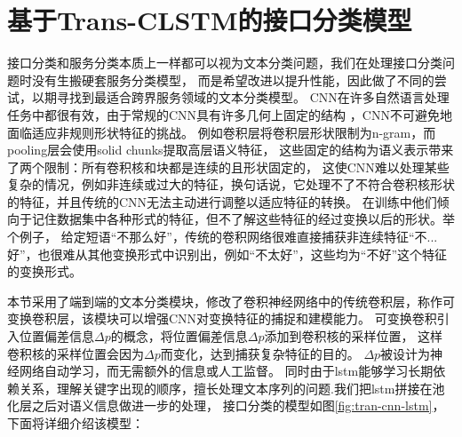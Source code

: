 \section{基于Trans-CLSTM的接口分类模型}
接口分类和服务分类本质上一样都可以视为文本分类问题，我们在处理接口分类问题时没有生搬硬套服务分类模型，
而是希望改进以提升性能，因此做了不同的尝试，以期寻找到最适合跨界服务领域的文本分类模型。
CNN在许多自然语言处理任务中都很有效，由于常规的CNN具有许多几何上固定的结构 ，CNN不可避免地面临适应非规则形状特征的挑战。
例如卷积层将卷积层形状限制为n-gram，而pooling层会使用solid chunks提取高层语义特征，
这些固定的结构为语义表示带来了两个限制：所有卷积核和块都是连续的且形状固定的，
这使CNN难以处理某些复杂的情况，例如非连续或过大的特征，换句话说，它处理不了不符合卷积核形状的特征，并且传统的CNN无法主动进行调整以适应特征的转换。
在训练中他们倾向于记住数据集中各种形式的特征，但不了解这些特征的经过变换以后的形状。举个例子，
给定短语“不那么好”，传统的卷积网络很难直接捕获非连续特征“不...好”，也很难从其他变换形式中识别出，例如“不太好”，这些均为“不好”这个特征的变换形式。

本节采用了端到端的文本分类模块，修改了卷积神经网络中的传统卷积层，称作可变换卷积层，该模块可以增强CNN对变换特征的捕捉和建模能力。
可变换卷积引入位置偏差信息$\Delta p$的概念，将位置偏差信息$\Delta p$添加到卷积核的采样位置，
这样卷积核的采样位置会因为$\Delta p$而变化，达到捕获复杂特征的目的。
$\Delta p$被设计为神经网络自动学习，而无需额外的信息或人工监督。
同时由于lstm能够学习长期依赖关系，理解关键字出现的顺序，擅长处理文本序列的问题.我们把lstm拼接在池化层之后对语义信息做进一步的处理，
接口分类的模型如图\ref{fig:tran-cnn-lstm}，下面将详细介绍该模型：

